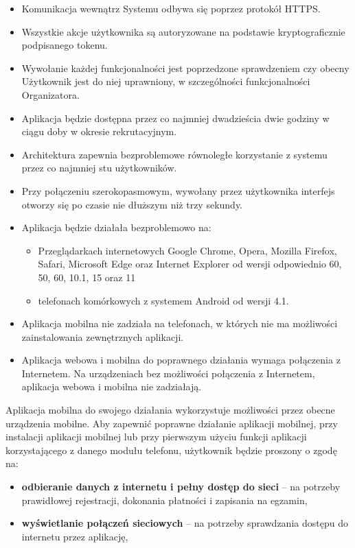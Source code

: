\documentclass{article}
\begin{document}
\begin{itemize}
	\item Komunikacja wewnątrz Systemu odbywa się poprzez protokół HTTPS.
	\item Wszystkie akcje użytkownika są autoryzowane na podstawie kryptograficznie podpisanego tokenu.
	\item Wywołanie każdej funkcjonalności jest poprzedzone sprawdzeniem czy obecny Użytkownik jest do niej uprawniony, w szczególności funkcjonalności Organizatora.
	\item Aplikacja będzie dostępna przez co najmniej dwadzieścia dwie godziny w ciągu doby w okresie rekrutacyjnym.
	\item Architektura zapewnia bezproblemowe równoległe korzystanie z systemu przez co najmniej stu użytkowników.
	\item Przy połączeniu szerokopasmowym, wywołany przez użytkownika interfejs otworzy się po czasie nie dłuższym niż trzy sekundy. 
	\item Aplikacja będzie działała bezproblemowo na:
	    \begin{itemize}
	        \item Przeglądarkach internetowych Google Chrome, Opera, Mozilla Firefox, Safari, Microsoft Edge oraz Internet Explorer od wersji odpowiednio 60, 50, 60, 10.1, 15 oraz 11
	        \item telefonach komórkowych z systemem Android od wersji 4.1.
	    \end{itemize}
	\item Aplikacja mobilna nie zadziała na telefonach, w których nie ma możliwości zainstalowania zewnętrznych aplikacji.
	\item Aplikacja webowa i mobilna do poprawnego działania wymaga połączenia z Internetem. Na urządzeniach bez możliwości połączenia z Internetem, aplikacja webowa i mobilna nie zadziałają.
\end{itemize}

Aplikacja mobilna do swojego działania wykorzystuje możliwości przez obecne urządzenia mobilne. Aby zapewnić poprawne działanie aplikacji mobilnej, przy instalacji aplikacji mobilnej lub przy pierwszym użyciu funkcji aplikacji korzystającego z danego modułu telefonu, użytkownik będzie proszony o zgodę na:
\begin{itemize}
	\item \textbf{odbieranie danych z internetu i pełny dostęp do sieci} – na potrzeby prawidłowej rejestracji, dokonania płatności i zapisania na egzamin,
	\item \textbf{wyświetlanie połączeń sieciowych} – na potrzeby sprawdzania dostępu do internetu przez aplikację,
\end{itemize}
\end{document}
